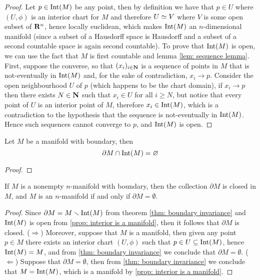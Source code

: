 \begin{proof}
Let \(p \in \operatorname{Int}(M)\) be any point, then by definition we have that \(p \in
U\) where \((U, \phi)\) is an interior chart for \(M\) and therefore \(U \simeq
V\) where \(V\) is some open subset of \(\mathbf{R}^n\), hence locally
euclidean, which makes \(\operatorname{Int}(M)\) an \(n\)-dimensional manifold (since a
subset of a Hausdorff space is Hausdorff and a subset of a second countable
space is again second countable). To prove that \(\operatorname{Int}(M)\) is open, we can
use the fact that \(M\) is first countable and lemma \cref{lem: sequence
lemma}. First, suppose the converse, so that \((x_i)_{i \in \mathbf{N}}\) is a
sequence of points in \(M\) that is not-eventually in \(\operatorname{Int}(M)\) and, for the
sake of contradiction, \(x_i \to p\). Consider the open neighbourhood \(U\) of
\(p\) (which happens to be the chart domain), if \(x_i \to p\) then there exists
\(N \in \mathbf{N}\) such that \(x_i \in U\) for all \(i \geq N\), but notice that every
point of \(U\) is an interior point of \(M\), therefore \(x_i \in \operatorname{Int}(M)\),
which is a contradiction to the hypothesis that the sequence is not-eventually
in \(\operatorname{Int}(M)\). Hence such sequences cannot converge to \(p\), and \(\operatorname{Int}(M)\)
is open.
\end{proof}

\begin{theorem}\label{thm: boundary invariance}
Let \(M\) be a manifold with boundary, then
\[
  \partial M \cap \operatorname{Int}(M) = \varnothing
\]
\end{theorem}

\begin{proof}
\end{proof}

\begin{corollary}
If \(M\) is a nonempty \(n\)-manifold with boundary, then the collection
\(\partial M\) is closed in \(M\), and \(M\) is an \(n\)-manifold if and only
if \(\partial M = \emptyset\).
\end{corollary}

\begin{proof}
Since \(\partial M = M \smallsetminus \operatorname{Int}(M)\) from theorem \cref{thm: boundary
invariance} and \(\operatorname{Int}(M)\) is open from \cref{prop: interior is a manifold},
then it follows that \(\partial M\) is closed. (\(\Rightarrow\)) Moreover,
suppose that \(M\) is a manifold, then given any point \(p \in M\) there
exists an interior chart \((U, \phi)\) such that \(p \in U \subseteq
\operatorname{Int}(M)\), hence \(\operatorname{Int}(M) = M\), and from \cref{thm: boundary invariance} we
conclude that \(\partial M = \emptyset\). (\(\Leftarrow\)) Suppose that
\(\partial M = \emptyset\), then from \cref{thm: boundary invariance} we
conclude that \(M = \operatorname{Int}(M)\), which is a manifold by \cref{prop: interior is a
manifold}.
\end{proof}
